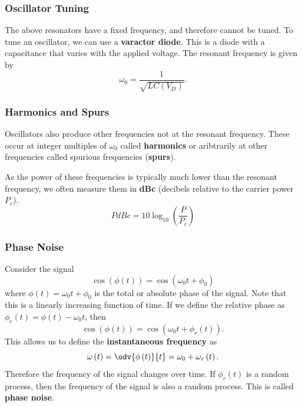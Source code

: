 \documentclass{article}
\begin{document}
\subsubsection{Oscillator Tuning}
The above resonators have a fixed frequency, and therefore cannot be
tuned. To tune an oscillator, we can use a \textbf{varactor diode}.
This is a diode with a capacitance that varies with the applied
voltage. The resonant frequency is given by
\begin{equation*}
    \omega_0 = \frac{1}{\sqrt{L C\left( V_D \right)}}.
\end{equation*}
\subsubsection{Harmonics and Spurs}
Oscillators also produce other frequencies not at the resonant
frequency. These occur at integer multiples of \(\omega_0\) called
\textbf{harmonics} or aribtrarily at other frequencies called spurious
frequencies (\textbf{spurs}).

As the power of these frequencies is typically much lower than the
resonant frequency, we often measure them in \textbf{dBc} (decibels
relative to the carrier power \(P_c\)).
\begin{equation*}
    P \unit{dBc} = 10 \log_{10}{\left( \frac{P}{P_c} \right)}
\end{equation*}
\subsubsection{Phase Noise}
Consider the signal
\begin{equation*}
    \cos{\left( \phi\left( t \right) \right)} = \cos{\left( \omega_0 t + \phi_0 \right)}
\end{equation*}
where \(\phi\left( t \right) = \omega_0 t + \phi_0\) is the total or
absolute phase of the signal. Note that this is a linearly increasing
function of time. If we define the relative phase as
\(\phi_r\left( t \right) = \phi\left( t \right) - \omega_0 t\), then
\begin{equation*}
    \cos{\left( \phi\left( t \right) \right)} = \cos{\left( \omega_0 t + \phi_r\left( t \right) \right)}.
\end{equation*}
This allows us to define the \textbf{instantaneous frequency} as
\begin{equation*}
    \omega\left( t \right) = \odv{\phi\left( t \right)}{t} = \omega_0 + \omega_r\left( t \right).
\end{equation*}
Therefore the frequency of the signal changes over time. If \(\phi_r\left( t \right)\)
is a random process, then the frequency of the signal is also a random
process. This is called \textbf{phase noise}.
\end{document}
